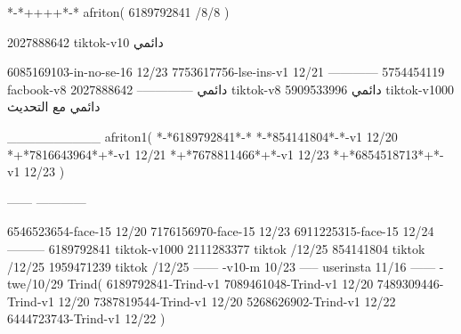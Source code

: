 *-*++++*-*
afriton(
6189792841 /8/8
)

2027888642 tiktok-v10
دائمي

6085169103-in-no-se-16 12/23
7753617756-lse-ins-v1 12/21
------------
5754454119 facbook-v8
دائمي
--------------
2027888642 tiktok-v8
دائمي
5909533996 tiktok-v1000
دائمي مع التحديث

__________
afriton1(
*-*6189792841*-*
*-*854141804*-*-v1 12/20
*+*7816643964*+*-v1 12/21
*+*7678811466*+*-v1 12/23
*+*6854518713*+*-v1 12/23
)

------
------------


6546523654-face-15 12/20
7176156970-face-15 12/23
6911225315-face-15 12/24
---------
6189792841 tiktok-v1000
2111283377 tiktok /12/25
854141804 tiktok /12/25
1959471239 tiktok /12/25
------
-v10-m 10/23
-----
userinsta 11/16
------
-twe/10/29
Trind(
6189792841-Trind-v1 
7089461048-Trind-v1 12/20
7489309446-Trind-v1 12/20
7387819544-Trind-v1 12/20
5268626902-Trind-v1 12/22
6444723743-Trind-v1 12/22
)
